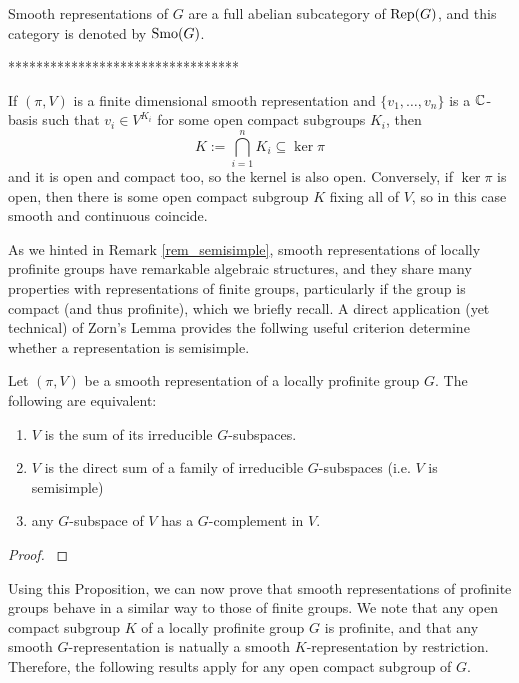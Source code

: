 Smooth representations of $G$ are a full abelian subcategory of $\mathrm{Rep}(G)$, and this category is denoted by $\mathrm{Smo}(G)$. 

*********************************

\begin{rem}
    If $(\pi,V)$ is a finite dimensional smooth representation and $\{v_1,\ldots,v_n\}$ is a $\mathbb{C}$-basis such that $v_i\in V^{K_i}$ for some open compact subgroups $K_i$, then 
    $$K:=\bigcap_{i=1}^n K_i\subseteq\ker\pi$$
    and it is open and compact too, so the kernel is also open. 
    Conversely, if $\ker\pi$ is open, then there is some open compact subgroup $K$ fixing all of $V$, so in this case smooth and continuous coincide. 
\end{rem}


As we hinted in Remark \ref{rem_semisimple}, smooth representations of locally profinite groups have remarkable algebraic structures, and they share many properties with representations of finite groups, particularly if the group is compact (and thus profinite), which we briefly recall. A direct application (yet technical) of Zorn's Lemma provides the follwing useful criterion determine whether a representation is semisimple. 

\begin{prop}\label{prop_semisimple}
    Let $(\pi,V)$ be a smooth representation of a locally profinite group $G$. The following are equivalent:
    \begin{enumerate}
        \item $V$ is the sum of its irreducible $G$-subspaces.
        \item $V$ is the direct sum of a family of irreducible $G$-subspaces (i.e. $V$ is semisimple)
        \item any $G$-subspace of $V$ has a $G$-complement in $V$.
    \end{enumerate}
\end{prop}

\begin{proof}
    \cite[2.2 Lemma]{BH1}
\end{proof}

Using this Proposition, we can now prove that smooth representations of profinite groups behave in a similar way to those of finite groups. We note that any open compact subgroup $K$ of a locally profinite group $G$ is profinite, and that any smooth $G$-representation is natually a smooth $K$-representation by restriction. Therefore, the following results apply for any open compact subgroup of $G$.

